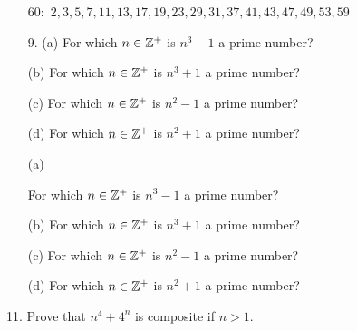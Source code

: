 \begin{mdframed}[style=darkAnswer,frametitle={Joe Starr}]
\begin{itemize}
    \item[$60:$] {$2, 3, 5, 7, 11, 13, 17, 19, 23, 29, 31, 37, 41, 43, 47, 49, 53, 59 $}
\end{itemize}
\end{mdframed}
\newpage
\begin{mdframed}[style=darkQuesion]
\begin{itemize}
    \item [9. (a)] {For which $n\in \mathbb{Z}^{\text{+}}$ is $n^{3}-1$ a prime number?}
    \item [(b)] {For which $n\in \mathbb{Z}^{\text{+}}$ is $n^{3}+1$ a prime number?}
    \item [(c)] {For which $n\in \mathbb{Z}^{\text{+}}$ is $n^{2}-1$ a prime number?}
    \item [(d)] {For which $n\in \mathbb{Z}^{\text{+}}$ is $n^{2}+1$ a prime number?}
    \end{itemize}
\end{mdframed}

\begin{mdframed}[style=darkAnswer,frametitle={Joe Starr}]
    \begin{itemize}
        \item [(a)] {For which $n\in \mathbb{Z}^{\text{+}}$ is $n^{3}-1$ a prime number?
        
        }
        \item [(b)] {For which $n\in \mathbb{Z}^{\text{+}}$ is $n^{3}+1$ a prime number?}
        \item [(c)] {For which $n\in \mathbb{Z}^{\text{+}}$ is $n^{2}-1$ a prime number?}
        \item [(d)] {For which $n\in \mathbb{Z}^{\text{+}}$ is $n^{2}+1$ a prime number?}
    \end{itemize}
\end{mdframed}

\newpage
\begin{mdframed}[style=darkQuesion]
11. Prove that $n^4+4^n$ is composite if $n>1$.
\end{mdframed}

